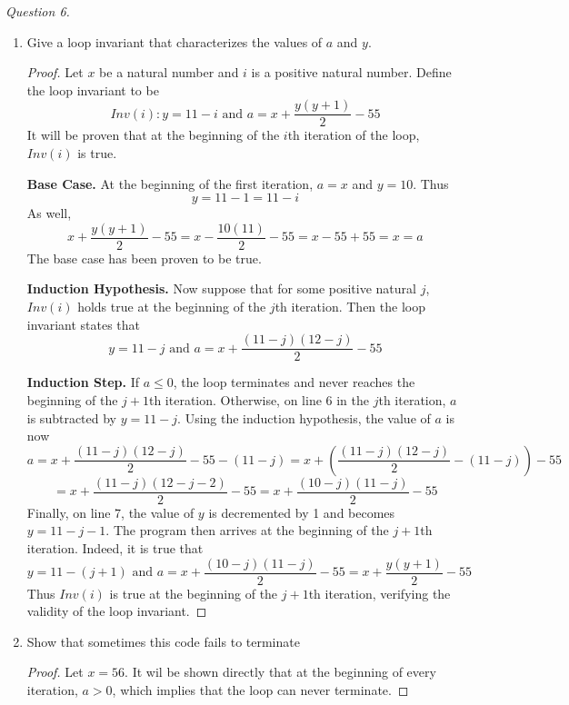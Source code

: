 \documentclass[11pt]{article}
\begin{document}
    \textit{Question 6.}\begin{enumerate}
        \item Give a loop invariant that characterizes the values of \(a\) and \(y\).
        \begin{proof}
            Let \(x\) be a natural number and \(i\) is a positive natural number. Define the loop invariant to be
            \[
                Inv(i) : y = 11 - i \text{ and } a = x + \frac{y(y+1)}{2} - 55
            \]
            It will be proven that at the beginning of the \(i\)th iteration of the loop, \(Inv(i)\) is true.

            \textbf{Base Case.} At the beginning of the first iteration, \(a=x\) and \(y=10\). Thus
            \[
                y = 11 - 1 = 11 - i
            \]
            As well,
            \[
                x + \frac{y(y+1)}{2} - 55 = x - \frac{10(11)}{2} - 55 = x - 55 + 55 = x = a
            \]
            The base case has been proven to be true.

            \textbf{Induction Hypothesis.} Now suppose that for some positive natural \(j\), \(Inv(i)\) holds true at the beginning of the \(j\)th iteration. Then the loop invariant states that 
            \[
                y = 11 - j \text{ and } a = x +\frac{(11-j)(12-j)}{2}-55
            \]

            \textbf{Induction Step.} If \(a \leq 0\), the loop terminates and never reaches the beginning of the \(j+1\)th iteration. Otherwise, on line 6 in the \(j\)th iteration, \(a\) is subtracted by \(y=11-j\). Using the induction hypothesis, the value of \(a\) is now
            \[
                a = x + \frac{(11-j)(12-j)}{2} - 55 - (11-j) = x + \left(\frac{(11-j)(12-j)}{2} - (11 - j)\right) - 55
            \]
            \[
                = x+\frac{(11-j)(12-j-2)}{2}-55 = x+\frac{(10-j)(11-j)}{2}-55
            \]
            Finally, on line 7, the value of \(y\) is decremented by 1 and becomes \(y = 11-j-1\). The program then arrives at the beginning of the \(j+1\)th iteration. Indeed, it is true that
            \[
                y = 11 - (j+1) \text{ and } a = x+\frac{(10-j)(11-j)}{2}-55 = x+\frac{y(y+1)}{2}-55
            \]
            Thus \(Inv(i)\) is true at the beginning of the \(j+1\)th iteration, verifying the validity of the loop invariant.

        \end{proof}
        
        \item Show that sometimes this code fails to terminate
        \begin{proof}
            Let \(x=56\). It wil be shown directly that at the beginning of every iteration, \(a > 0\), which implies that the loop can never terminate.


\end{proof}
\end{enumerate}
\end{document}
